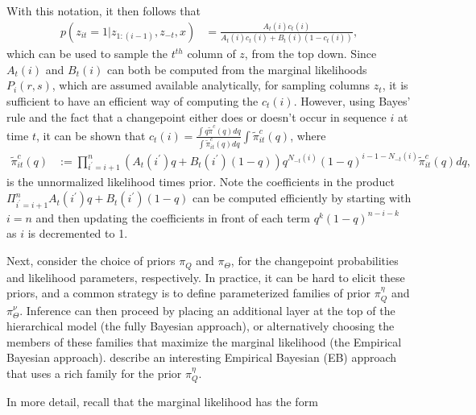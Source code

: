 \documentclass{article}
\begin{document}
With this notation, it then follows that
\begin{align*}
  p\left(z_{it} = 1 \vert z_{1:(i - 1)}, z_{-t}, x\right) &= \frac{A_{t}\left(i\right)c_{t}\left(i\right)}{A_{t}\left(i\right)c_t\left(i\right) + B_t\left(i\right)\left(1 - c_t\left(i\right)\right)},
\end{align*}
which can be used to sample the $t^{th}$ column of $z$, from the top down. Since
$A_{t}\left(i\right)$ and $B_{t}\left(i\right)$ can both be computed from the
marginal likelihoods $P_{i}\left(r, s\right)$, which are assumed available
analytically, for sampling columns $z_t$, it is sufficient to have an efficient
way of computing the $c_{t}\left(i\right)$. However, using Bayes' rule and the
fact that a changepoint either does or doesn't occur in sequence $i$ at time
$t$, it can be shown that $c_{t}\left(i\right) = \frac{\int q
  \tilde{\pi}^{c}\left(q\right) dq}{\int \tilde{\pi}_{it}^{c}\left(q\right)
  dq}{\int \tilde{\pi}_{it}^{c}\left(q\right)}$, where
\begin{align*}
  \tilde{\pi}_{it}^{c}\left(q\right) &:= \prod_{i^\prime = i + 1}^{n} \left(A_{t}\left(i^\prime\right)q + B_{t}\left(i^\prime\right)\left(1 - q\right)\right)q^{N_{-t}\left(i\right)}\left(1 - q\right)^{i - 1 - N_{-t}\left(i\right)} \tilde{\pi}_{it}^{c}\left(q\right) dq,
\end{align*}
is the unnormalized likelihood times prior. Note the coefficients in the product
$\Pi_{i^\prime = i + 1}^{n} A_{t}\left(i^\prime\right)q +
B_{t}\left(i^\prime\right)\left(1 - q\right)$ can be computed efficiently by
starting with $i = n$ and then updating the coefficients in front of each term
$q^k \left(1 - q\right)^{n - i - k}$ as $i$ is decremented to 1.

Next, consider the choice of priors $\pi_{Q}$ and $\pi_{\Theta}$, for the
changepoint probabilities and likelihood parameters, respectively. In practice,
it can be hard to elicit these priors, and a common strategy is to define
parameterized families of prior $\pi_{Q}^{\eta}$ and $\pi_{\Theta}^{\nu}$.
Inference can then proceed by placing an additional layer at the top of the
hierarchical model (the fully Bayesian approach), or alternatively choosing the
members of these families that maximize the marginal likelihood (the Empirical
Bayesian approach). \citep{fan2015empirical} describe an interesting Empirical
Bayesian (EB) approach that uses a rich family for the prior $\pi_{Q}^{\eta}$.

In more detail, recall that the marginal likelihood has the form
\begin{align}
 \label{eq:pi_q_marginal_lik}
\end{align}
\end{document}
